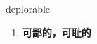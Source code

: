 
\begin{frame}
{\huge deplorable}
\begin{center}
\begin{enumerate}\Large
  \item \textbf{可鄙的，可耻的}
\end{enumerate}
\end{center}
\end{frame}
